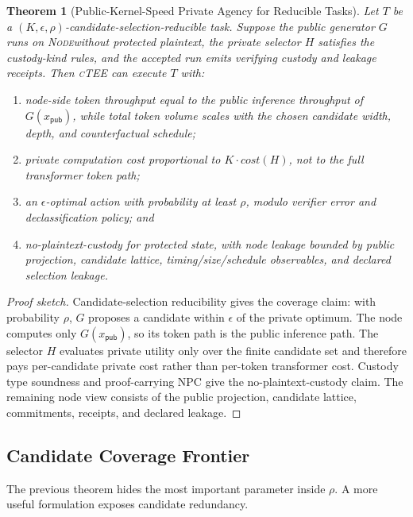 \documentclass[11pt]{article}
\newtheorem{theorem}{Theorem}
\newcommand{\ctee}{\textnormal{\textsc{cTEE}}}
\newcommand{\roletext}[1]{\textnormal{\textsc{#1}}\xspace}
\newcommand{\node}{\ifmmode\mathsf{Node}\else\roletext{Node}\fi}
\begin{document}
\begin{theorem}[Public-Kernel-Speed Private Agency for Reducible Tasks]
Let \(T\) be a \((K,\epsilon,\rho)\)-candidate-selection-reducible task. Suppose
the public generator \(G\) runs on \node without protected plaintext, the
private selector \(H\) satisfies the custody-kind rules, and the accepted run
emits verifying custody and leakage receipts. Then \ctee{} can execute \(T\)
with:
\begin{enumerate}[leftmargin=1.5em]
\item node-side token throughput equal to the public inference throughput of
\(G(x_{\mathsf{pub}})\), while total token volume scales with the chosen
candidate width, depth, and counterfactual schedule;
\item private computation cost proportional to \(K \cdot cost(H)\), not to the
full transformer token path;
\item an \(\epsilon\)-optimal action with probability at least \(\rho\), modulo
verifier error and declassification policy; and
\item no-plaintext-custody for protected state, with node leakage bounded by
public projection, candidate lattice, timing/size/schedule observables, and
declared selection leakage.
\end{enumerate}
\end{theorem}

\begin{proof}[Proof sketch]
Candidate-selection reducibility gives the coverage claim: with probability
\(\rho\), \(G\) proposes a candidate within \(\epsilon\) of the private optimum.
The node computes only \(G(x_{\mathsf{pub}})\), so its token path is the public
inference path. The selector \(H\) evaluates private utility only over the
finite candidate set and therefore pays per-candidate private cost rather than
per-token transformer cost. Custody type soundness and proof-carrying NPC give
the no-plaintext-custody claim. The remaining node view consists of the public
projection, candidate lattice, commitments, receipts, and declared leakage.
\end{proof}

\subsection{Candidate Coverage Frontier}

The previous theorem hides the most important parameter inside \(\rho\). A more
useful formulation exposes candidate redundancy.
\end{document}
